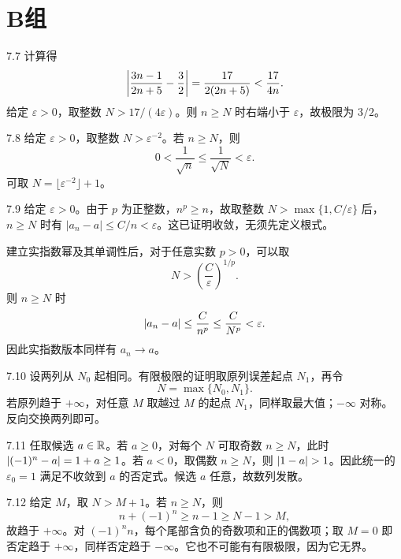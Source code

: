 \section*{B组}

\begin{solution}{7.7}
计算得
\[
 \left|\frac{3n-1}{2n+5}-\frac32\right|
 =\frac{17}{2(2n+5)}<\frac{17}{4n}.
\]
给定 \(\varepsilon>0\)，取整数 \(N>17/(4\varepsilon)\)。则 \(n\ge N\) 时右端小于 \(\varepsilon\)，故极限为 \(3/2\)。
\end{solution}

\begin{solution}{7.8}
给定 \(\varepsilon>0\)，取整数 \(N>\varepsilon^{-2}\)。若 \(n\ge N\)，则
\[
 0<\frac1{\sqrt n}\le\frac1{\sqrt N}<\varepsilon.
\]
可取 \(N=\lfloor\varepsilon^{-2}\rfloor+1\)。
\end{solution}

\begin{solution}{7.9}
给定 \(\varepsilon>0\)。由于 \(p\) 为正整数，\(n^p\ge n\)，故取整数 \(N>\max\{1,C/\varepsilon\}\) 后，\(n\ge N\) 时有 \(|a_n-a|\le C/n<\varepsilon\)。这已证明收敛，无须先定义根式。

建立实指数幂及其单调性后，对于任意实数 \(p>0\)，可以取
\[
 N>\left(\frac C\varepsilon\right)^{1/p}.
\]
则 \(n\ge N\) 时
\[
 \left|a_n-a\right|\le\frac C{n^p}
 \le\frac C{N^p}<\varepsilon.
\]
因此实指数版本同样有 \(a_n\to a\)。
\end{solution}

\begin{solution}{7.10}
设两列从 \(N_0\) 起相同。有限极限的证明取原列误差起点 \(N_1\)，再令
\[
 N=\max\{N_0,N_1\}.
\]
若原列趋于 \(+\infty\)，对任意 \(M\) 取越过 \(M\) 的起点 \(N_1\)，同样取最大值；\(-\infty\) 对称。反向交换两列即可。
\end{solution}

\begin{solution}{7.11}
任取候选 \(a\in\mathbb{R}\)。若 \(a\ge0\)，对每个 \(N\) 可取奇数 \(n\ge N\)，此时
\(\left|(-1)^n-a\right|=1+a\ge1\)。若 \(a<0\)，取偶数 \(n\ge N\)，则
\(\abs{1-a}>1\)。因此统一的 \(\varepsilon_0=1\) 满足不收敛到 \(a\) 的否定式。候选 \(a\) 任意，故数列发散。
\end{solution}

\begin{solution}{7.12}
给定 \(M\)，取 \(N>M+1\)。若 \(n\ge N\)，则
\[
 n+(-1)^n\ge n-1\ge N-1>M,
\]
故趋于 \(+\infty\)。对 \((-1)^nn\)，每个尾部含负的奇数项和正的偶数项；取 \(M=0\) 即否定趋于 \(+\infty\)，同样否定趋于 \(-\infty\)。它也不可能有有限极限，因为它无界。
\end{solution}

